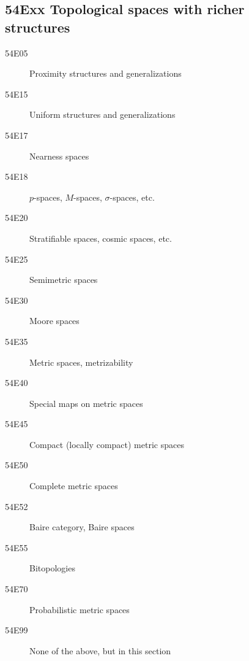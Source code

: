 \subsection*{54Exx  Topological spaces with richer structures }\label{54Exx}
\begin{description}  
\item [54E05]\label{54E05} Proximity structures and generalizations
\item [54E15]\label{54E15} Uniform structures and generalizations
\item [54E17]\label{54E17} Nearness spaces
\item [54E18]\label{54E18} $p$-spaces, $M$-spaces, $\sigma$-spaces, etc.
\item [54E20]\label{54E20} Stratifiable spaces, cosmic spaces, etc.
\item [54E25]\label{54E25} Semimetric spaces
\item [54E30]\label{54E30} Moore spaces
\item [54E35]\label{54E35} Metric spaces, metrizability
\item [54E40]\label{54E40} Special maps on metric spaces
\item [54E45]\label{54E45} Compact (locally compact) metric spaces
\item [54E50]\label{54E50} Complete metric spaces
\item [54E52]\label{54E52} Baire category, Baire spaces
\item [54E55]\label{54E55} Bitopologies
\item [54E70]\label{54E70} Probabilistic metric spaces
\item [54E99]\label{54E99} None of the above, but in this section
\end{description}
